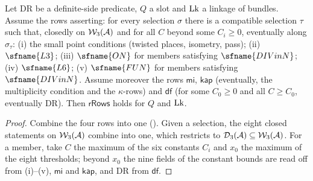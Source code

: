 \begin{lemma}\label{pf:rows:rrowsparts}
Let $\mathrm{DR}$ be a definite-side predicate, $Q$ a slot and $\mathrm{Lk}$ a linkage of bundles. Assume the rows asserting:
for every selection $\sigma$ there is a compatible selection $\tau$ such that, closedly on $\mathcal{W}_3(\mathcal A)$ and for all
$C$ beyond some $C_i\ge0$, eventually along $\sigma_\tau$: (i) the small point conditions (twisted places, isometry, pass);
(ii) $\sfname{L3}$; (iii) $\sfname{ON}$ for members satisfying $\sfname{DIVinN}$; (iv) $\sfname{L6}$; (v) $\sfname{FUN}$ for members
satisfying $\sfname{DIVinN}$. Assume moreover the rows $\mathsf{mi}$, $\mathsf{kap}$ (eventually, the multiplicity condition and
the $\kappa$-rows) and $\mathsf{df}$ (for some $C_0\ge0$ and all $C\ge C_0$, eventually $\mathrm{DR}$). Then $\mathsf{rRows}$ holds
for $Q$ and $\mathrm{Lk}$.
\end{lemma}

\begin{proof}
Combine the four rows into one (). Given a selection, the eight closed statements on
$\mathcal{W}_3(\mathcal A)$ combine into one, which restricts to $\mathcal{D}_3(\mathcal A)\subseteq\mathcal{W}_3(\mathcal A)$. For a member,
take $C$ the maximum of the six constants $C_i$ and $x_0$ the maximum of the eight thresholds; beyond $x_0$ the nine fields
of the constant bounds are read off from (i)--(v), $\mathsf{mi}$ and $\mathsf{kap}$, and $\mathrm{DR}$ from $\mathsf{df}$.
\end{proof}

